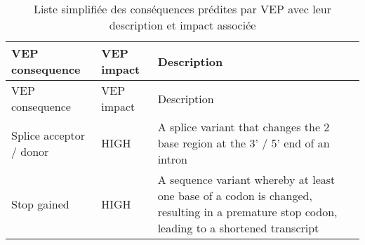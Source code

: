 \documentclass[12pt,twoside]{reedthesis}
\theoremstyle{definition}
\theoremstyle{definition}
\theoremstyle{remark}
\begin{document}
  \begin{longtable}[]{@{}lll@{}}
  \caption{\label{tab:tabvepcsq} Liste simplifiée des conséquences prédites
  par VEP avec leur description et impact associée}\tabularnewline
  \toprule
  \begin{minipage}[b]{0.18\columnwidth}\raggedright\strut
  VEP consequence\strut
  \end{minipage} & \begin{minipage}[b]{0.11\columnwidth}\raggedright\strut
  VEP impact\strut
  \end{minipage} & \begin{minipage}[b]{0.63\columnwidth}\raggedright\strut
  Description\strut
  \end{minipage}\tabularnewline
  \midrule
  \endfirsthead
  \toprule
  \begin{minipage}[b]{0.18\columnwidth}\raggedright\strut
  VEP consequence\strut
  \end{minipage} & \begin{minipage}[b]{0.11\columnwidth}\raggedright\strut
  VEP impact\strut
  \end{minipage} & \begin{minipage}[b]{0.63\columnwidth}\raggedright\strut
  Description\strut
  \end{minipage}\tabularnewline
  \midrule
  \endhead
  \begin{minipage}[t]{0.18\columnwidth}\raggedright\strut
  Splice acceptor / donor\strut
  \end{minipage} & \begin{minipage}[t]{0.11\columnwidth}\raggedright\strut
  HIGH\strut
  \end{minipage} & \begin{minipage}[t]{0.63\columnwidth}\raggedright\strut
  A splice variant that changes the 2 base region at the 3' / 5' end of an
  intron\strut
  \end{minipage}\tabularnewline
  \begin{minipage}[t]{0.18\columnwidth}\raggedright\strut
  Stop gained\strut
  \end{minipage} & \begin{minipage}[t]{0.11\columnwidth}\raggedright\strut
  HIGH\strut
  \end{minipage} & \begin{minipage}[t]{0.63\columnwidth}\raggedright\strut
  A sequence variant whereby at least one base of a codon is changed,
  resulting in a premature stop codon, leading to a shortened
  transcript\strut
  \end{minipage}\tabularnewline

\end{longtable}
\end{document}
